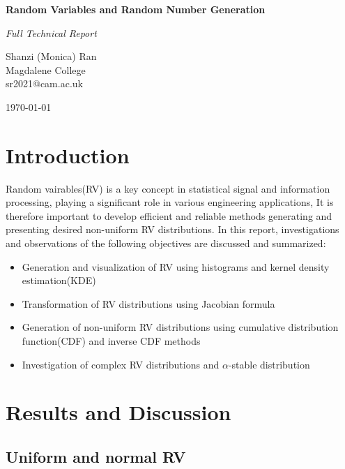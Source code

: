 \documentclass[11pt, twocolumn]{article}
\begin{document}
\begin{titlepage}
    \centering
    \vspace*{1cm}

    {\huge \textbf{Random Variables and Random Number Generation}}

    {\huge \textit{Full Technical Report}}
    \vspace{15cm}

    {\Large Shanzi (Monica) Ran \\
    Magdalene College\\

    sr2021@cam.ac.uk\\}

    \vfill

    {\large \today}

\end{titlepage}

\section{Introduction}
    Random vairables(RV) is a key concept in statistical signal and information processing, 
    playing a significant role in various engineering applications, 
    It is  therefore important to develop efficient and reliable methods generating and presenting desired non-uniform RV distributions.
    In this report, investigations and observations of the following objectives are discussed and summarized: \newline
    \vspace{-1em}
    \begin{itemize}
        \item Generation and visualization of RV using histograms and kernel density estimation(KDE)
        \item Transformation of RV distributions using Jacobian formula
        \item Generation of non-uniform RV distributions using cumulative distribution function(CDF) and inverse CDF methods
        \item Investigation of complex RV distributions and $\alpha$-stable distribution
    \end{itemize}

\section{Results and Discussion}

\subsection{Uniform and normal RV}
\end{document}
